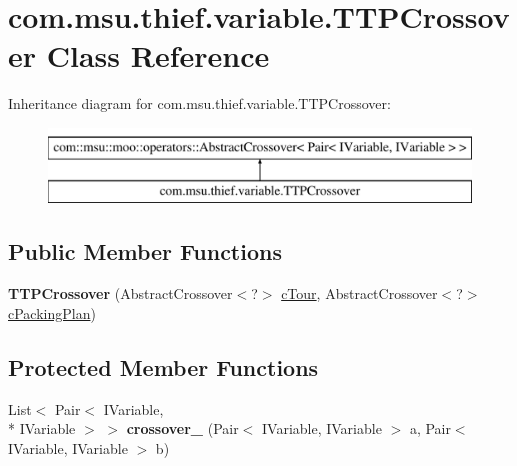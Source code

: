 \hypertarget{classcom_1_1msu_1_1thief_1_1variable_1_1TTPCrossover}{\section{com.\-msu.\-thief.\-variable.\-T\-T\-P\-Crossover Class Reference}
\label{classcom_1_1msu_1_1thief_1_1variable_1_1TTPCrossover}
}
Inheritance diagram for com.\-msu.\-thief.\-variable.\-T\-T\-P\-Crossover\-:\begin{figure}[H]
\begin{center}
\leavevmode
\includegraphics[height=2.000000cm]{classcom_1_1msu_1_1thief_1_1variable_1_1TTPCrossover}
\end{center}
\end{figure}
\subsection*{Public Member Functions}
\begin{DoxyCompactItemize}
\item 
\hypertarget{classcom_1_1msu_1_1thief_1_1variable_1_1TTPCrossover_aeadae4cc69d473615b388657dd482c90}{{\bfseries T\-T\-P\-Crossover} (Abstract\-Crossover$<$?$>$ \hyperlink{classcom_1_1msu_1_1thief_1_1variable_1_1TTPCrossover_a392a724cbf3c5e88e2648adcfd17f02f}{c\-Tour}, Abstract\-Crossover$<$?$>$ \hyperlink{classcom_1_1msu_1_1thief_1_1variable_1_1TTPCrossover_a65c9d474482814cdc26a896c3377e160}{c\-Packing\-Plan})}\label{classcom_1_1msu_1_1thief_1_1variable_1_1TTPCrossover_aeadae4cc69d473615b388657dd482c90}

\end{DoxyCompactItemize}
\subsection*{Protected Member Functions}
\begin{DoxyCompactItemize}
\item 
\hypertarget{classcom_1_1msu_1_1thief_1_1variable_1_1TTPCrossover_ad94acfeb50ec5590f5b797fe702382d3}{List$<$ Pair$<$ I\-Variable, \\*
I\-Variable $>$ $>$ {\bfseries crossover\-\_\-} (Pair$<$ I\-Variable, I\-Variable $>$ a, Pair$<$ I\-Variable, I\-Variable $>$ b)}\label{classcom_1_1msu_1_1thief_1_1variable_1_1TTPCrossover_ad94acfeb50ec5590f5b797fe702382d3}

\end{DoxyCompactItemize}
